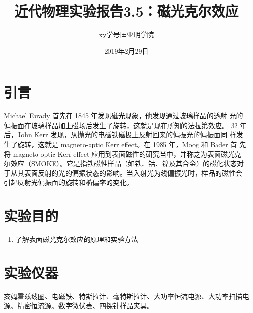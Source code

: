 \documentclass[a4paper]{article}
\title{近代物理实验报告3.5：磁光克尔效应}
\author{xy\quad 学号\quad 匡亚明学院}
\date{2019年2月29日}
\begin{document}
\maketitle


\section{引言}
Michael Farady 首先在 1845 年发现磁光现象，他发现通过玻璃样品的透射
光的偏振面在玻璃样品加上磁场后发生了旋转，这就是现在所知的法拉第效应。
32 年后，John Kerr 发现，从抛光的电磁铁磁极上反射回来的偏振光的偏振面同
样发生了旋转，这就是 magneto-optic Kerr effect。在 1985 年，Moog 和 Bader 首
先将 magneto-optic Kerr effect 应用到表面磁性的研究当中，并称之为表面磁光克
尔效应（SMOKE）。它是指铁磁性样品（如铁、钴、镍及其合金）的磁化状态对
于从其表面反射的光的偏振状态的影响。当入射光为线偏振光时，样品的磁性会
引起反射光偏振面的旋转和椭偏率的变化。
\section{实验目的}
\begin{enumerate}
	\item 了解表面磁光克尔效应的原理和实验方法
\end{enumerate}

\section{实验仪器}
亥姆霍兹线圈、电磁铁、特斯拉计、毫特斯拉计、大功率恒流电源、大功率扫描电源、精密恒流源、数字微伏表、四探针样品夹具。
\end{document}
